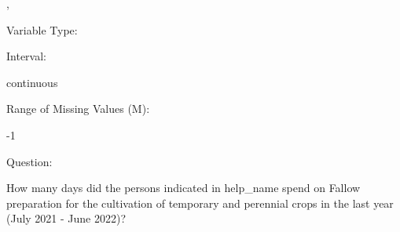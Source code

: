 \documentclass[
]{article}
\begin{document}
,

\begin{minipage}[t]{0.3\linewidth}

\colorbox{mypink1}{}

\end{minipage}%
\begin{minipage}[t]{0.7\linewidth}

\colorbox{mypink1}{\makebox[\textwidth]{\strut\bfseries\color{black}  
 }}

\end{minipage}

\begin{minipage}[t]{0.3\linewidth}

Variable Type:

\end{minipage}%
\begin{minipage}[t]{0.7\linewidth}

\end{minipage}

\begin{minipage}[t]{0.3\linewidth}

Interval:

\end{minipage}%
\begin{minipage}[t]{0.7\linewidth}

continuous

\end{minipage}

\begin{minipage}[t]{0.3\linewidth}

Range of Missing Values (M):

\end{minipage}%
\begin{minipage}[t]{0.7\linewidth}

-1

\end{minipage}

\begin{minipage}[t]{0.3\linewidth}

Question:

\end{minipage}%
\begin{minipage}[t]{0.7\linewidth}

How many days did the persons indicated in help\_name spend on Fallow
preparation for the cultivation of temporary and perennial crops in the
last year (July 2021 - June 2022)?

\end{minipage}
\end{document}
